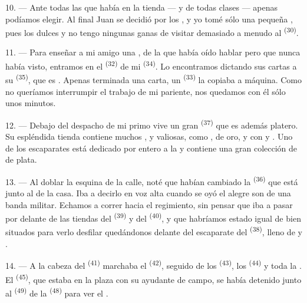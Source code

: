 10. --- Ante todas las  que había en la tienda ---
 y  de todas
clases --- apenas podíamos elegir. Al final Juan se decidió por los
, y yo tomé sólo una pequeña
, pues los dulces  y
no tengo ningunas ganas de visitar demasiado a menudo al 
\textsuperscript{(30)}.

\VUsaut{3.0mm}

11. --- Para enseñar a mi amigo una , de la que
había oído hablar pero que nunca había visto, entramos en el
 \textsuperscript{(32)} de mi  \textsuperscript{(34)}. Lo
encontramos dictando sus cartas a su  \textsuperscript{(35)}, que
es . Apenas terminada una carta, un
 \textsuperscript{(33)} la copiaba a máquina. Como no queríamos
interrumpir el trabajo de mi pariente, nos quedamos con él sólo unos
minutos.

12. --- Debajo del despacho de mi primo vive un gran
 \textsuperscript{(37)} que es además platero. Su
espléndida tienda contiene muchos ,  y  valiosas,
como ,  de oro,
 y  con  y
. Uno de los escaparates está dedicado por entero a la
 y contiene una gran colección de  de
plata.

13. --- Al doblar la esquina de la calle, noté que habían cambiado la
 \textsuperscript{(36)} que está junto al  de la casa. Iba
a decirlo en voz alta cuando se oyó el alegre son de una banda militar.
Echamos a correr hacia el regimiento, sin pensar que iba a pasar por
delante de las tiendas del  \textsuperscript{(39)} y del
 \textsuperscript{(40)}, y que habríamos estado igual de bien
situados para verlo desfilar quedándonos delante del escaparate del
 \textsuperscript{(38)}, lleno de  y
.

\VUsaut{3.0mm}

14. --- A la cabeza del  \textsuperscript{(41)} marchaba el
 \textsuperscript{(42)}, seguido de los 
\textsuperscript{(43)}, los  \textsuperscript{(44)} y toda la .
El  \textsuperscript{(45)}, que estaba en la plaza con su ayudante de
campo, se había detenido junto al  \textsuperscript{(49)} de la
 \textsuperscript{(48)} para ver el .


